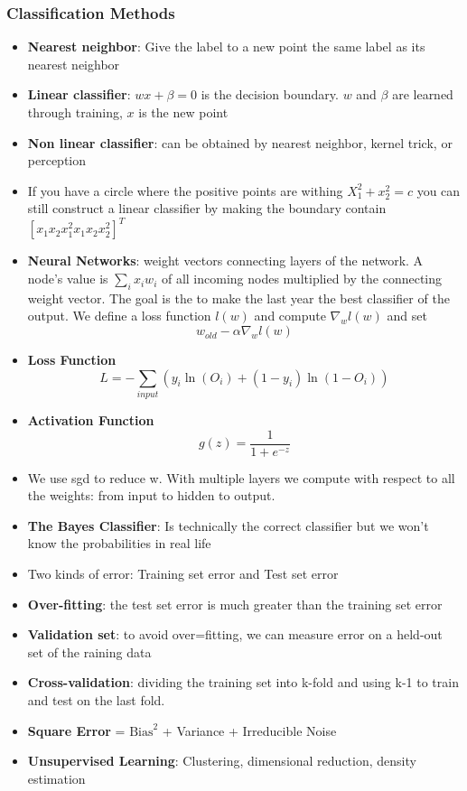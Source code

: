 \documentclass{article}
\begin{document}
\subsubsection{Classification Methods}
\begin{itemize}
\item \textbf{Nearest neighbor}: Give the label to a new point the same label as its nearest neighbor
\item \textbf{Linear classifier}: $wx + \beta = 0$ is the decision boundary. $w$ and $\beta$ are learned through training, $x$ is the new point 
\item \textbf{Non linear classifier}: can be obtained by nearest neighbor, kernel trick, or perception
\item If you have a circle where the positive points are withing $X_1^2 + x_2^2 = c$ you can still construct a linear classifier by making the boundary contain $[x_1 x_2 x_1^2 x_1x_2 x_2^2]^T$
\item \textbf{Neural Networks}: weight vectors connecting layers of the network. A node's value is $\sum_i x_iw_i$ of all incoming nodes multiplied by the connecting weight vector. The goal is the to make the last year the best classifier of the output. We define a loss function $l(w)$ and compute $\nabla_w l(w)$ and set $$w_{old} - \alpha \nabla_w l(w)$$
\item \textbf{Loss Function}
$$L = - \sum_{input} (y_i \ln(O_i) + (1-y_i)\ln(1-O_i))$$
\item \textbf{Activation Function}
$$g(z) = \frac{1}{1 + e^{-z}}$$
\item We use sgd to reduce w. With multiple layers we compute with respect to all the weights: from input to hidden to output.
\item \textbf{The Bayes Classifier}: Is technically the correct classifier but we won't know the probabilities in real life
\item Two kinds of error: Training set error and Test set error
\item \textbf{Over-fitting}: the test set error is much greater than the training set error
\item \textbf{Validation set}: to avoid over=fitting, we can measure error on a held-out set of the raining data
\item \textbf{Cross-validation}: dividing the training set into k-fold and using k-1 to train and test on the last fold.
\item \textbf{Square Error} = $\textrm{Bias}^2$ + Variance + Irreducible Noise
\item \textbf{Unsupervised Learning}: Clustering, dimensional reduction, density estimation
\end{itemize}
\end{document}
